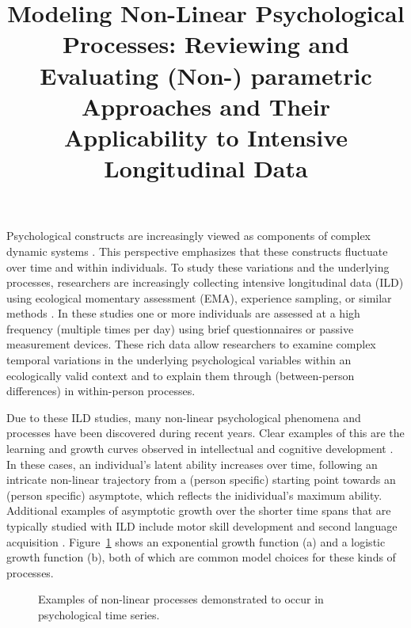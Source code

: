 \documentclass[jou, floatsintext]{apa7}
\title{Modeling Non-Linear Psychological Processes: Reviewing and Evaluating
  (Non-) parametric Approaches and Their Applicability to Intensive
  Longitudinal Data}
\begin{document}
\maketitle

Psychological constructs are increasingly viewed as components of complex
dynamic systems \parencite{nesselroade_studying_2004, wang_investigating_2012}.
This perspective emphasizes that these constructs fluctuate over time and
within individuals. To study these variations and the underlying processes,
researchers are increasingly collecting intensive longitudinal data (ILD) using
ecological momentary assessment (EMA), experience sampling, or similar methods
\parencite{fritz_so_2023}. In these studies one or more individuals are
assessed at a high frequency (multiple times per day) using brief
questionnaires or passive measurement devices. These rich data allow
researchers to examine complex temporal variations in the underlying
psychological variables within an ecologically valid context and to explain
them through (between-person differences) in within-person processes.

Due to these ILD studies, many non-linear psychological phenomena and processes
have been discovered during recent years. Clear examples of this are the
learning and growth curves observed in intellectual and cognitive development
\parencite{kunnen_dynamic_2012, mcardle_comparative_2002}. In these cases, an
individual's latent ability increases over time, following an intricate
non-linear trajectory from a (person specific) starting point towards an
(person specific) asymptote, which reflects the inidividual's maximum ability.
Additional examples of asymptotic growth over the shorter time spans that are
typically studied with ILD include motor skill development
\parencite{newell_time_2001} and second language acquisition
\parencite{de_bot_dynamic_2007}. Figure~\ref{fig:examplar_npn} shows an
exponential growth function (a) and a logistic growth function (b), both of
which are common model choices for these kinds of processes.

\begin{figure}[!ht]
  \caption{Examples of non-linear processes demonstrated to occur in
    psychological time series.}
  \label{fig:examplar_npn}
\end{figure}
\end{document}
